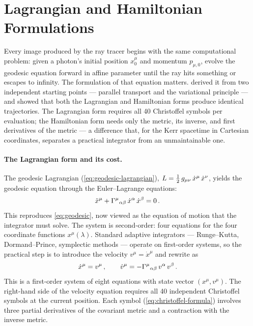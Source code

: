 \section{Lagrangian and Hamiltonian Formulations}
\label{sec:geo-formulations}

Every image produced by the ray tracer begins with the same computational
problem: given a photon's initial position $x^\mu_0$ and momentum
$p_{\mu,0}$, evolve the geodesic equation forward in affine parameter until
the ray hits something or escapes to infinity.  The formulation of that
equation matters.   derived it from two independent
starting points --- parallel transport and the variational principle --- and
showed that both the Lagrangian and Hamiltonian forms produce identical
trajectories.  The Lagrangian form requires all 40 Christoffel symbols per
evaluation; the Hamiltonian form needs only the metric, its inverse, and
first derivatives of the metric --- a difference that, for the Kerr
spacetime in Cartesian coordinates, separates a practical integrator from an
unmaintainable one.

\paragraph{The Lagrangian form and its cost.}

The geodesic Lagrangian (\cref{eq:geodesic-lagrangian}),
$L = \tfrac{1}{2}\,g_{\mu\nu}\,\dot{x}^\mu\,\dot{x}^\nu$, yields the
geodesic equation through the Euler--Lagrange equations:
%
\begin{equation}
  \ddot{x}^\mu + \Gamma^{\mu}{}_{\alpha \beta}\,
  \dot{x}^\alpha\,\dot{x}^\beta = 0 \,.
  \label{eq:geo-lagrangian-eom}
\end{equation}
%
This reproduces \cref{eq:geodesic}, now viewed as the equation of motion that
the integrator must solve.  The system is second-order: four equations for
the four coordinate functions $x^\mu(\lambda)$.  Standard adaptive
integrators --- Runge--Kutta, Dormand--Prince, symplectic methods --- operate
on first-order systems, so the practical step is to introduce the velocity
$v^\mu = \dot{x}^\mu$ and rewrite as
%
\begin{equation}
  \dot{x}^\mu = v^\mu \,, \qquad
  \dot{v}^\mu = -\Gamma^{\mu}{}_{\alpha \beta}\,
  v^\alpha\,v^\beta \,.
  \label{eq:geo-lagrangian-first-order}
\end{equation}
%
This is a first-order system of eight equations with state vector
$(x^\mu, v^\mu)$.  The right-hand side of the velocity equation requires
all 40 independent Christoffel symbols at the current position.  Each
symbol (\cref{eq:christoffel-formula}) involves three partial derivatives
of the covariant metric and a contraction with the inverse metric.

